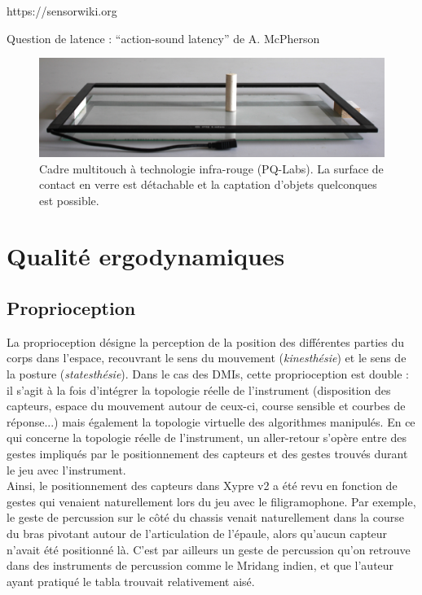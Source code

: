 https://sensorwiki.org

Question de latence : ``action-sound latency'' de A. McPherson

\begin{figure}[!htbp]
	\captionsetup{format=plain}%
	\includegraphics[width=\textwidth]{gfx/05_interfaces/PQlabs-G4overlay.jpg}
	\caption[Cadre multitouch à technologie infra-rouge]{Cadre multitouch à technologie infra-rouge (PQ-Labs). La surface de contact en verre est détachable et la captation d'objets quelconques est possible.}
	\label{fig:interface:PQlabs-G4overlay}
\end{figure}



\section{Qualité ergodynamiques}


\subsection{Proprioception}
\noindent La proprioception désigne la perception de la position des différentes parties du corps dans l'espace, recouvrant le sens du mouvement (\textit{kinesthésie}) et le sens de la posture (\textit{statesthésie}). Dans le cas des \glspl{DMI}, cette proprioception est double : il s'agit à la fois d'intégrer la topologie réelle de l'instrument (disposition des capteurs, espace du mouvement autour de ceux-ci, course sensible et courbes de réponse...) mais également la topologie virtuelle des algorithmes manipulés. En ce qui concerne la topologie réelle de l'instrument, un aller-retour s'opère entre des gestes impliqués par le positionnement des capteurs et des gestes trouvés durant le jeu avec l'instrument.\\
\indent Ainsi, le positionnement des capteurs dans Xypre v2 a été revu en fonction de gestes qui venaient naturellement lors du jeu avec le filigramophone. Par exemple, le geste de percussion sur le côté du chassis venait naturellement dans la course du bras pivotant autour de l'articulation de l'épaule, alors qu'aucun capteur n'avait été positionné là. C'est par ailleurs un geste de percussion qu'on retrouve dans des instruments de percussion comme le Mridang indien, et que l'auteur ayant pratiqué le tabla trouvait relativement aisé.

